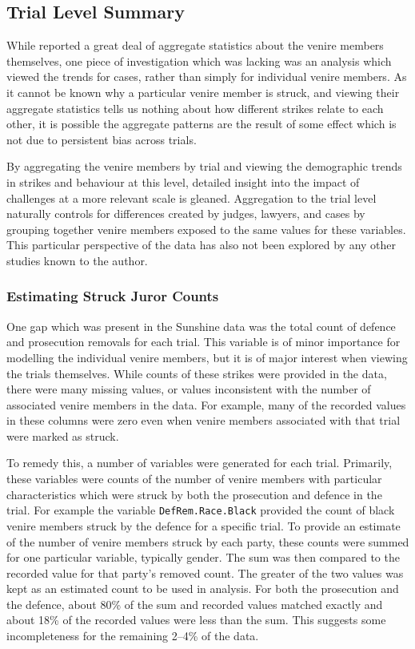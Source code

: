 \subsection{Trial Level Summary} \label{sec:casesum}

While \cite{JurySunshineProj} reported a great deal of aggregate statistics about the venire members themselves, one piece of
investigation which was lacking was an analysis which viewed the trends for cases, rather than simply for
individual venire members. As it cannot be known why a particular venire member is struck, and viewing their aggregate
statistics tells us nothing about how different strikes relate to each other, it is possible the aggregate patterns are the result
of some effect which is not due to persistent bias across trials.

By aggregating the venire members by trial and viewing the demographic trends in strikes and behaviour at this level,
detailed insight into the impact of challenges at a more relevant scale is gleaned. Aggregation to the trial level naturally controls for differences created by judges, lawyers, and cases by grouping together venire members exposed to the same values for these variables. This particular perspective of the data has also not been explored by any other studies
known to the author.

\subsubsection{Estimating Struck Juror Counts} \label{subsec:struckjur}

One gap which was present in the Sunshine data was the total count of defence and prosecution removals for each trial. This
variable is of minor importance for modelling the individual venire
members, but it is of major interest when viewing the trials
themselves. While counts of these strikes were provided in the data, there were many missing values, or values inconsistent with
the number of associated venire members in the data. For example, many of the recorded values in these columns were zero even when
venire members associated with that trial were marked as struck.

To remedy this, a number of variables were generated for each trial. Primarily, these variables were counts of the number of
venire members with particular characteristics which were struck by both the prosecution and defence in the trial. For example the
variable \texttt{DefRem.Race.Black} provided the count of black venire members struck by the defence for a specific trial. To
provide an estimate of the number of venire members struck by each
party, these counts were summed for one particular
variable, typically gender. The sum was then compared to the recorded value for that party's removed count. The greater of the two
values was kept as an estimated count to be used in analysis. For both the prosecution and the defence, about 80\% of the sum and
recorded values matched exactly and about 18\% of the recorded values were less than the sum. This suggests some incompleteness
for the remaining 2--4\% of the data.

